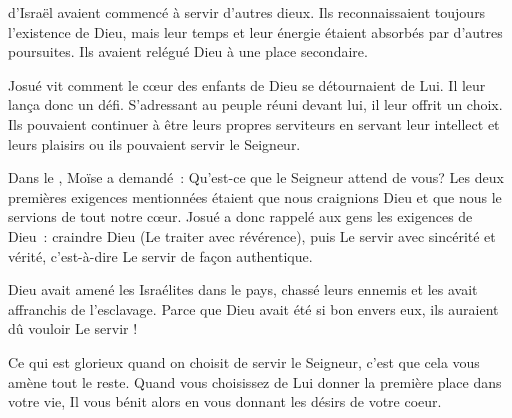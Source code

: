 \dvrule






 d'Israël avaient commencé à servir d'autres dieux.
 Ils reconnaissaient toujours l'existence de Dieu, mais leur temps
 et leur énergie étaient absorbés par d'autres poursuites.
 Ils avaient relégué Dieu à une place secondaire.

Josué vit comment le cœur des enfants de Dieu se détournaient de Lui.
 Il leur lança donc un défi. S'adressant au peuple réuni devant lui,
 il leur offrit un choix. Ils pouvaient continuer à être
 leurs propres serviteurs
 \ocadr en servant leur intellect et leurs plaisirs \fcadr{}
 ou ils pouvaient servir le Seigneur.


Dans le , Moïse a demandé~:
 \og Qu'est-ce que le Seigneur attend de vous? \fg{}
 Les deux premières exigences mentionnées
 étaient que nous craignions Dieu et que nous le servions de tout notre cœur.
 Josué a donc rappelé aux gens les exigences de Dieu~:
 craindre Dieu (Le traiter avec révérence),
 puis Le servir avec sincérité et vérité,
 c'est-à-dire Le servir de façon authentique.

Dieu avait amené les Israélites dans le pays,
 chassé leurs ennemis et les avait affranchis de l'esclavage.
 Parce que Dieu avait été si bon envers eux, ils auraient dû vouloir Le servir !

Ce qui est glorieux quand on choisit de servir le Seigneur,
 c'est que cela vous amène tout le reste.
 Quand vous choisissez de Lui donner la première place dans votre vie,
 Il vous bénit alors en vous donnant les désirs de votre coeur. 

\dvrule

